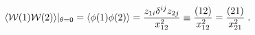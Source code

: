 \begin{equation}\label{prpr} 
\langle {\cal W} (1){\cal W} (2) \rangle|_{\theta=0} =\langle \phi(1)\phi(2) \rangle = \frac{z_{1i} \delta^{ij} z_{2j}}{x^2_{12}} \equiv \frac{(12)}{x^2_{12}} = 
\frac{(21)}{x^2_{21}}\;. 
\end{equation} 
